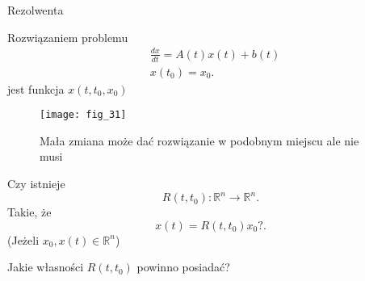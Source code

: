 \documentclass[../main.tex]{subfiles}
\begin{document}
\begin{definicja}
    Rezolwenta\\
\end{definicja}
    Rozwiązaniem problemu
    \begin{align*}
        &\frac{dx}{dt} = A(t)x(t)+b(t)\\
        &x(t_0)=x_0
    .\end{align*}
    jest funkcja $x(t,t_0,x_0)$
\begin{figure}
    \centering
    \texttt{[image: fig\_31]}
    \caption{Mała zmiana może dać rozwiązanie w podobnym miejscu ale nie musi}
    \label{fig:fig_31}
\end{figure}
\begin{pytanie}
    Czy istnieje
    \[
        R(t,t_0): \mathbb{R}^n\to\mathbb{R}^n
    .\] Takie, że
    \[
        x(t) = R(t,t_0)x_0?
    .\](Jeżeli $x_0,x(t)\in\mathbb{R}^n$)
\end{pytanie}
\begin{pytanie}
    Jakie własności $R(t,t_0)$ powinno posiadać?
\end{pytanie}
\end{document}
